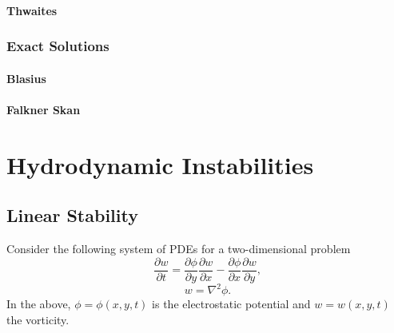 \documentclass[oneside,a4paper,11pt]{report}
\begin{document}
\subsection{Thwaites}

\section{Exact Solutions}

\subsection{Blasius}

\subsection{Falkner Skan}

\part{Hydrodynamic Instabilities}

\chapter{Linear Stability}
Consider the following system of PDEs for a two-dimensional problem
\begin{equation}
    \frac{\partial w}{\partial t} = \frac{\partial \phi}{\partial y}\frac{\partial w}{\partial x} - \frac{\partial \phi}{\partial x} \frac{\partial w}{\partial y},
\end{equation}
\begin{equation}
    w = \nabla^2 \phi .
\end{equation}
In the above, $\phi = \phi(x,y,t)$ is the electrostatic potential and $w = w(x,y,t)$ the vorticity.
\end{document}
